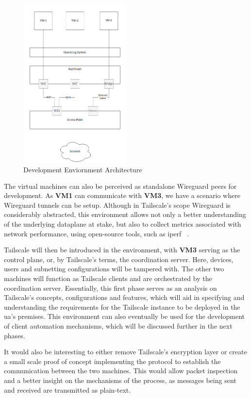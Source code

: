 \documentclass[11pt,twoside,a4paper]{report}
\begin{document}
\begin{figure}[h]
\centering
\includegraphics[width=0.5\textwidth]{dev.png}
\caption{Development Enviornment Architecture}
\label{fig:sandbox}
\end{figure}

The virtual machines can also be perceived as standalone Wireguard peers for development. As \textbf{VM1} can communicate with \textbf{VM3}, we have a scenario where Wireguard tunnels can be setup. Although in Tailscale's scope Wireguard is considerably abstracted, this environment allows not only a better understanding of the underlying dataplane at stake, but also to collect metrics associated with network performance, using open-source tools, such as iperf ~\cite{iperfws}.

Tailscale will then be introduced in the environment, with \textbf{VM3} serving as the control plane, or, by Tailscale's terms, the coordination server. Here, devices, users and subnetting configurations will be tampered with. The other two machines will function as Tailscale clients and are orchestrated by the coordination server. Essentially, this first phase serves as an analysis on Tailscale's concepts, configurations and features, which will aid in specifying and understanding the requirements for the Tailscale instance to be deployed in the \ac{ua}'s premises. This environment can also eventually be used for the development of client automation mechanisms, which will be discussed further in the next phases.

It would also be interesting to either remove Tailscale's encryption layer or create a small scale proof of concept implementing the protocol to establish the communication between the two machines. This would allow packet inspection and a better insight on the mechanisms of the process, as messages being sent and received are transmitted as plain-text.
\end{document}

